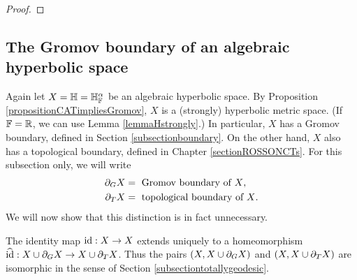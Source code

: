 \begin{proof}
\end{proof}

\bigskip
\subsection{The Gromov boundary of an algebraic hyperbolic space}
\label{subsubsectionboundariesequivalent}

Again let $X = \H = \H_\F^\alpha$ be an algebraic hyperbolic space. By Proposition \ref{propositionCATimpliesGromov}, $X$ is a (strongly) hyperbolic metric space. (If $\F = \R$, we can use Lemma \ref{lemmaHstrongly}.) In particular, $X$ has a Gromov boundary, defined in Section \ref{subsectionboundary}. On the other hand, $X$ also has a topological boundary, defined in Chapter \ref{sectionROSSONCTs}. For this subsection only, we will write
\begin{align*}
\partial_G X &= \textup{ Gromov boundary of $X$}, \\
\partial_T X &= \textup{ topological boundary of $X$}.
\end{align*}
We will now show that this distinction is in fact unnecessary.
\begin{proposition}
\label{propositionboundariesequivalent}
The identity map $\mathrm{id}:X\to X$ extends uniquely to a homeomorphism $\widehat{\mathrm{id}}:X\cup\partial_G X\to X\cup\partial_T X$. Thus the pairs $(X,X\cup\partial_G X)$ and $(X,X\cup\partial_T X)$ are isomorphic in the sense of Section \ref{subsectiontotallygeodesic}.
\end{proposition}

